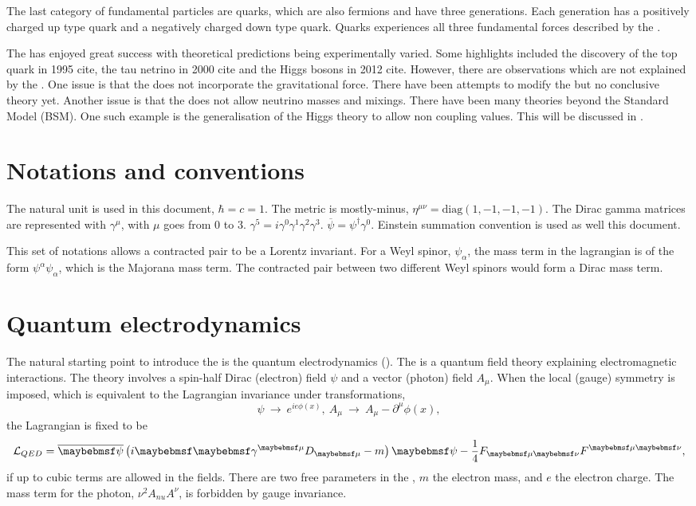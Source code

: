 The last category of fundamental particles are quarks, which are also fermions and have three generations. Each generation has a positively charged up type quark and a negatively charged down type quark. Quarks experiences all three fundamental forces described by the \SM.

The \SM has enjoyed great success with theoretical predictions being experimentally varied. Some highlights included the discovery of the top quark in 1995 cite{}, the tau netrino in 2000 cite{} and the Higgs bosons in 2012 cite{}. However, there are observations which are not explained by the \SM. One issue is that the \SM does not incorporate the gravitational force. There have been attempts to modify the \SM but no conclusive theory yet. Another issue is that the \SM does not allow neutrino masses and mixings. There have been many theories beyond the Standard Model (BSM). One such example is the generalisation of the Higgs theory to allow non \SM coupling values. This will be discussed in \Section{}.
\section{Notations and conventions}

The natural unit is used in this document, $\hbar = c = 1$. The metric is mostly-minus, $\eta^{\mu\nu} = \text{diag}(1,-1,-1,-1)$. The Dirac gamma matrices are represented with $\gamma^{\mu}$, with $\mu$ goes from 0 to 3. $\gamma^5 = i \gamma^{0}\gamma^{1}\gamma^{2}\gamma^{3}$. $\overline{\psi} = \psi^{\dagger}\gamma^0$. Einstein summation convention is used as well this document.

This set of notations allows a contracted pair to be a Lorentz invariant. For a Weyl spinor, $\psi_\alpha$, the mass term in the lagrangian is of the form $\psi^{\alpha}\psi_\alpha$, which is the Majorana mass term. The contracted pair between two different Weyl spinors would form a Dirac mass term.


\section{Quantum electrodynamics}

The natural starting point to introduce the \SM is the quantum electrodynamics (\QED). The \QED is a quantum field theory explaining electromagnetic interactions. The theory involves a spin-half Dirac (electron) field $\psi$ and a vector (photon) field $A_{\mu}$. When the local (gauge) symmetry is imposed, which is equivalent to the Lagrangian invariance under transformations,
\begin{equation}
\psi\ \to\ e^{ie\phi(x)},\ A_{\mu}\ \to\ A_{\mu} - \partial^{\mu}\phi(x),
\end{equation}
the Lagrangian is fixed to be
\begin{equation}
\Lagr_{QED} = \overline{\psi} \left( i\Dstroke - m \right)\psi -  \frac{1}{4}F_{\mu\nu}F^{\mu\nu},
\end{equation}
if up to cubic terms are allowed in the fields. There are two free parameters in the \QED, $m$ the electron mass, and $e$ the electron charge. The mass term for the photon, $\nu^{2}A_{nu}A^{\nu}$, is forbidden by gauge invariance.

